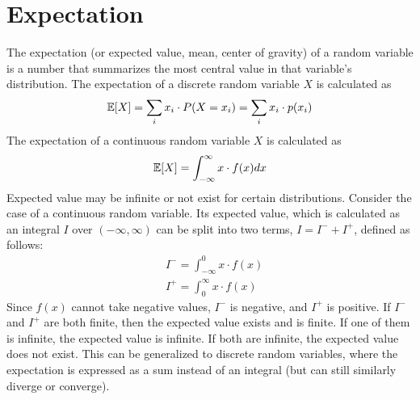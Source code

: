 \section*{Expectation}
The expectation (or expected value, mean, center of gravity) of a random variable is a number that summarizes the most central value in that variable's distribution.
{
    The expectation of a discrete random variable $X$ is calculated as
    \begin{align*}
        \mathbb{E}[X] = \sum_i x_i \cdot P(X = x_i) = \sum_i x_i \cdot p(x_i)
    \end{align*}
    The expectation of a continuous random variable $X$ is calculated as
    \begin{align*}
        \mathbb{E}[X] = \int_{-\infty}^{\infty} x \cdot f(x) dx
    \end{align*}
}
Expected value may be infinite or not exist for certain distributions. Consider the case of a continuous random variable. Its expected value, which is calculated as an integral $I$ over $(-\infty, \infty)$ can be split into two terms, $I = I^- + I^+$, defined as follows:
\begin{align*}
    &I^- = \int_{-\infty}^{0} x \cdot f(x) \\
    &I^+ = \int_{0}^{\infty} x \cdot f(x)
\end{align*}
Since $f(x)$ cannot take negative values, $I^-$ is negative, and $I^+$ is positive. If $I^-$ and $I^+$ are both finite, then the expected value exists and is finite. If one of them is infinite, the expected value is infinite. If both are infinite, the expected value does not exist. This can be generalized to discrete random variables, where the expectation is expressed as a sum instead of an integral (but can still similarly diverge or converge).

